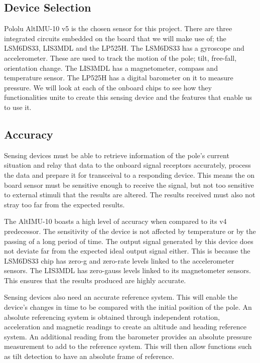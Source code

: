 \documentclass[12pt]{article}
\begin{document}
\subsection{Device Selection}
Pololu AltIMU-10 v5 is the chosen sensor for this project. There are three integrated circuits embedded on the board that
we will make use of; the LSM6DS33, LIS3MDL and the LP525H. The LSM6DS33 has a gyroscope and accelerometer. 
These are used to track the motion of the pole; tilt, free-fall, orientation change. 
The LIS3MDL has a magnetometer, compass and temperature sensor.
The LP525H has a digital barometer on it to measure pressure. 
We will look at each of the onboard chips to see how they functionalities unite to create this sensing device and the 
features that enable us to use it. 

\subsection{Accuracy}
Sensing devices must be able to retrieve information of the pole’s current situation and relay that data to the onboard 
signal receptors accurately, process the data and prepare it for transceival to a responding device. This means the on 
board sensor must be sensitive enough to receive the signal, but not too sensitive to external stimuli that the results 
are altered. The results received must also not stray too far from the expected results.

The AltIMU-10 boasts a high level of accuracy when compared to its v4 predecessor. 
The sensitivity of the device is not affected by temperature or by the passing of a long period of time. 
The output signal generated by this device does not deviate far from the expected ideal output signal either. 
This is because the LSM6DS33 chip has zero-g and zero-rate levels linked to the accelerometer sensors. 
The LIS3MDL has zero-gauss levels linked to its magnetometer sensors. 
This ensures that the results produced are highly accurate. 

Sensing devices also need an accurate reference system. This will enable the device's changes in time to be compared 
with the initial position of the pole. An absolute referencing system is obtained through independent rotation, 
acceleration and magnetic readings to create an altitude and heading reference system. An additional reading from the 
barometer provides an absolute pressure measurement to add to the reference system. 
This will then allow functions such as tilt detection to have an absolute frame of reference. 
\end{document}
